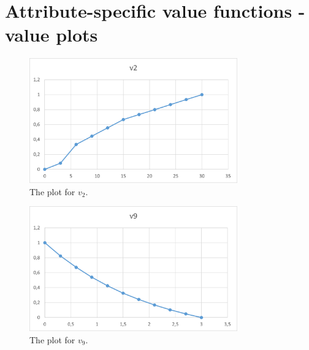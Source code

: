 \documentclass{article}
\begin{document}
\section{Attribute-specific value functions - value plots}
	\begin{figure}[H]
		\includegraphics[width=0.8\textwidth]{3_v2.png}
		\caption{The plot for $v_2$.}
		\label{fig:3_v2}
	\end{figure}
	\begin{figure}[H]
		\includegraphics[width=0.8\textwidth]{3_v9.png}
		\caption{The plot for $v_9$.}
		\label{fig:3_v9}
	\end{figure}
\end{document}
